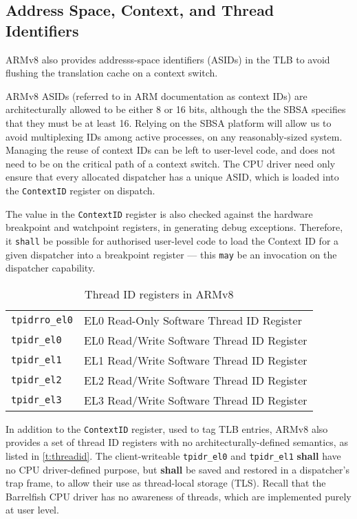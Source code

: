 \documentclass[a4paper,twoside]{report}
\begin{document}
\subsection{Address Space, Context, and Thread Identifiers}

ARMv8 also provides addresss-space identifiers (ASIDs) in the TLB to avoid
flushing the translation cache on a context switch.

ARMv8 ASIDs (referred to in ARM documentation as context IDs) are
architecturally allowed to be either 8 or 16 bits, although the the SBSA
specifies that they must be at least 16. Relying on the SBSA platform will
allow us to avoid multiplexing IDs among active processes, on any
reasonably-sized system.  Managing the reuse of context IDs can be left to
user-level code, and does not need to be on the critical path of a context
switch. The CPU driver need only ensure that every allocated dispatcher has a
unique ASID, which is loaded into the \texttt{ContextID} register on dispatch.

The value in the \texttt{ContextID} register is also checked against the
hardware breakpoint and watchpoint registers, in generating debug exceptions.
Therefore, it \texttt{shall} be possible for authorised user-level code to
load the Context ID for a given dispatcher into a breakpoint register --- this
\texttt{may} be an invocation on the dispatcher capability.

\begin{table}
\begin{center}
\begin{tabular}{ll}
\texttt{tpidrro\_el0} & EL0 Read-Only Software Thread ID Register \\
\texttt{tpidr\_el0} & EL0 Read/Write Software Thread ID Register \\
\texttt{tpidr\_el1} & EL1 Read/Write Software Thread ID Register \\
\texttt{tpidr\_el2} & EL2 Read/Write Software Thread ID Register \\
\texttt{tpidr\_el3} & EL3 Read/Write Software Thread ID Register \\
\end{tabular}
\end{center}
\caption{Thread ID registers in ARMv8}
\label{t:threadid}
\end{table}

In addition to the \texttt{ContextID} register, used to tag TLB entries, ARMv8
also provides a set of thread ID registers with no architecturally-defined
semantics, as listed in \autoref{t:threadid}. The client-writeable
\texttt{tpidr\_el0} and \texttt{tpidr\_el1} \textbf{shall} have no CPU
driver-defined purpose, but \textbf{shall} be saved and restored in a
dispatcher's trap frame, to allow their use as thread-local storage (TLS).
Recall that the Barrelfish CPU driver has no awareness of threads, which are
implemented purely at user level.
\end{document}
